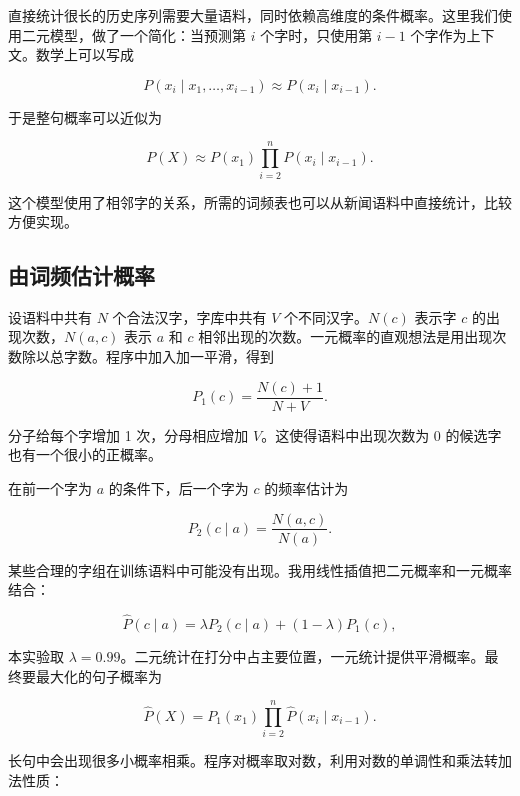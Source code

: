 \documentclass[11pt,a4paper]{ctexart}
\begin{document}
直接统计很长的历史序列需要大量语料，同时依赖高维度的条件概率。这里我们使用二元模型，做了一个简化：当预测第 $i$ 个字时，只使用第 $i-1$ 个字作为上下文。数学上可以写成

\begin{equation}
P(x_i\mid x_1,\ldots,x_{i-1})\approx P(x_i\mid x_{i-1}).
\end{equation}

于是整句概率可以近似为

\begin{equation}
P(X)\approx P(x_1)\prod_{i=2}^{n}P(x_i\mid x_{i-1}).
\end{equation}

这个模型使用了相邻字的关系，所需的词频表也可以从新闻语料中直接统计，比较方便实现。

\subsection{由词频估计概率}

设语料中共有 $N$ 个合法汉字，字库中共有 $V$ 个不同汉字。$N(c)$ 表示字 $c$ 的出现次数，$N(a,c)$ 表示 $a$ 和 $c$ 相邻出现的次数。一元概率的直观想法是用出现次数除以总字数。程序中加入加一平滑，得到

\begin{equation}
P_1(c)=\frac{N(c)+1}{N+V}.
\end{equation}

分子给每个字增加 1 次，分母相应增加 $V$。这使得语料中出现次数为 0 的候选字也有一个很小的正概率。

在前一个字为 $a$ 的条件下，后一个字为 $c$ 的频率估计为

\begin{equation}
P_2(c\mid a)=\frac{N(a,c)}{N(a)}.
\end{equation}

某些合理的字组在训练语料中可能没有出现。我用线性插值把二元概率和一元概率结合：

\begin{equation}
\widehat P(c\mid a)
=\lambda P_2(c\mid a)+(1-\lambda)P_1(c),
\end{equation}

本实验取 $\lambda=0.99$。二元统计在打分中占主要位置，一元统计提供平滑概率。最终要最大化的句子概率为

\begin{equation}
\widehat P(X)=P_1(x_1)
\prod_{i=2}^{n}\widehat P(x_i\mid x_{i-1}).
\end{equation}

长句中会出现很多小概率相乘。程序对概率取对数，利用对数的单调性和乘法转加法性质：
\end{document}
